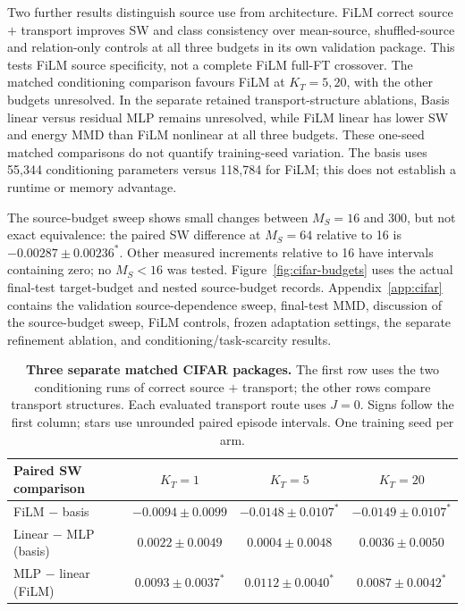 \documentclass{article}
\newcommand{\KT}{K_T}
\newcommand{\sigstar}{^{\ast}}
\begin{document}
Two further results distinguish source use from architecture. FiLM correct source $+$ transport improves SW and class consistency over mean-source, shuffled-source and relation-only controls at all three budgets in its own validation package. This tests FiLM source specificity, not a complete FiLM full-FT crossover. The matched conditioning comparison favours FiLM at $K_T=5,20$, with the other budgets unresolved. In the separate retained transport-structure ablations, Basis linear versus residual MLP remains unresolved, while FiLM linear has lower SW and energy MMD than FiLM nonlinear at all three budgets. These one-seed matched comparisons do not quantify training-seed variation. The basis uses 55,344 conditioning parameters versus 118,784 for FiLM; this does not establish a runtime or memory advantage.

The source-budget sweep shows small changes between $M_S=16$ and 300, but not exact equivalence: the paired SW difference at $M_S=64$ relative to 16 is $-0.00287\pm0.00236\sigstar$. Other measured increments relative to 16 have intervals containing zero; no $M_S<16$ was tested. Figure~\ref{fig:cifar-budgets} uses the actual final-test target-budget and nested source-budget records. Appendix~\ref{app:cifar} contains the validation source-dependence sweep, final-test MMD, discussion of the source-budget sweep, FiLM controls, frozen adaptation settings, the separate refinement ablation, and conditioning/task-scarcity results.

\begin{table}[t]
\centering\footnotesize
\caption{\textbf{Three separate matched CIFAR packages.} The first row uses the two conditioning runs of correct source $+$ transport; the other rows compare transport structures. Each evaluated transport route uses $J=0$. Signs follow the first column; stars use unrounded paired episode intervals. One training seed per arm.}
\label{tab:cifar-ablation}
\begin{tabular}{lccc}
\toprule
Paired SW comparison & $\KT=1$ & $\KT=5$ & $\KT=20$\\
\midrule
FiLM $-$ basis & $-0.0094\pm0.0099$ & $-0.0148\pm0.0107\sigstar$ & $-0.0149\pm0.0107\sigstar$\\
Linear $-$ MLP (basis) & $0.0022\pm0.0049$ & $0.0004\pm0.0048$ & $0.0036\pm0.0050$\\
MLP $-$ linear (FiLM) & $0.0093\pm0.0037\sigstar$ & $0.0112\pm0.0040\sigstar$ & $0.0087\pm0.0042\sigstar$\\
\bottomrule
\end{tabular}
\end{table}
\end{document}

